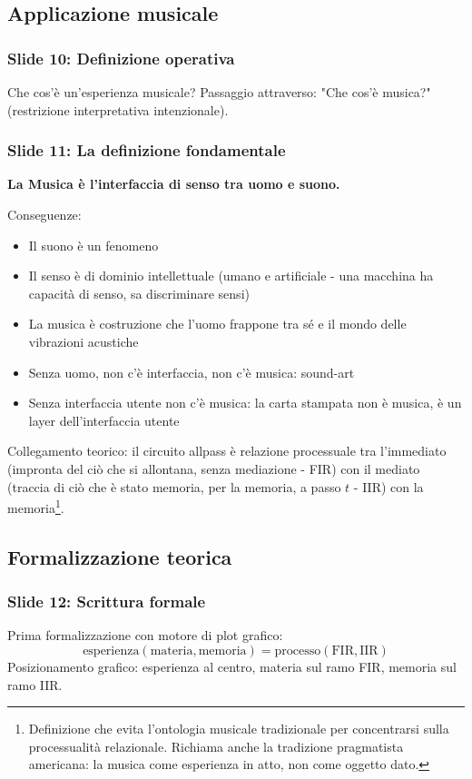 \subsection{Applicazione musicale}

\subsubsection{Slide 10: Definizione operativa}
Che cos'è un'esperienza musicale?
Passaggio attraverso: "Che cos'è musica?" (restrizione interpretativa intenzionale).

\subsubsection{Slide 11: La definizione fondamentale}
\textbf{La Musica è l'interfaccia di senso tra uomo e suono.}

Conseguenze:
\begin{itemize}
\item Il suono è un fenomeno
\item Il senso è di dominio intellettuale (umano e artificiale - una macchina ha capacità di senso, sa discriminare sensi)
\item La musica è costruzione che l'uomo frappone tra sé e il mondo delle vibrazioni acustiche
\item Senza uomo, non c'è interfaccia, non c'è musica: sound-art
\item Senza interfaccia utente non c'è musica: la carta stampata non è musica, è un layer dell'interfaccia utente
\end{itemize}
Collegamento teorico: il circuito allpass è relazione processuale tra l'immediato (impronta del ciò che si allontana, senza mediazione - FIR) con il mediato (traccia di ciò che è stato memoria, per la memoria, a passo $t$ - IIR) con la memoria\footnote{Definizione che evita l'ontologia musicale tradizionale per concentrarsi sulla processualità relazionale. Richiama anche la tradizione pragmatista americana: la musica come esperienza in atto, non come oggetto dato.}.

\subsection{Formalizzazione teorica}

\subsubsection{Slide 12: Scrittura formale}
Prima formalizzazione con motore di plot grafico:
$$\text{esperienza}(\text{materia},\text{memoria}) = \text{processo}(\text{FIR},\text{IIR})$$
Posizionamento grafico: esperienza al centro, materia sul ramo FIR, memoria sul ramo IIR.

